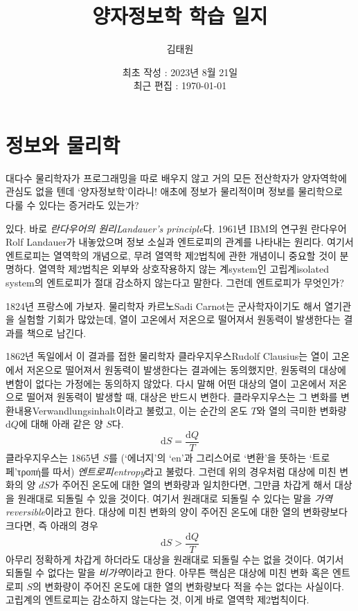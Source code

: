 \documentclass[a4paper,chapter,atbegshi]{oblivoir}
\title{양자정보학 학습 일지}
\author{김태원}
\date{최초 작성 : 2023년 8월 21일 \\ 최근 편집 : \today}
\begin{document}
\maketitle

\chapter{정보와 물리학}
대다수 물리학자가 프로그래밍을 따로 배우지 않고 거의 모든 전산학자가 양자역학에
관심도 없을 텐데 `양자정보학'이라니! 애초에 정보가 물리적이며 정보를 물리학으로
다룰 수 있다는 증거라도 있는가? 

있다. 바로 \emph{란다우어의 원리\tiny Landauer's principle}다.
1961년 IBM의 연구원 란다우어{\tiny Rolf Landauer}가 내놓았으며 정보 소실과
엔트로피의 관계를 나타내는 원리다. 여기서 엔트로피는 열역학의 개념으로, 
무려 열역학 제2법칙에 관한 개념이니 중요할 것이 분명하다. 열역학 제2법칙은
외부와 상호작용하지 않는 계{\tiny system}인 고립계{\tiny isolated system}의
엔트로피가 절대 감소하지 않는다고 말한다. 그런데 엔트로피가 무엇인가? 

1824년 프랑스에 가보자. 물리학자 카르노{\tiny Sadi Carnot}는 군사학자이기도
해서 열기관을 실험할 기회가 많았는데, 열이 고온에서 저온으로 떨어져서 원동력이
발생한다는 결과를 책으로 남긴다.

1862년 독일에서 이 결과를 접한 물리학자 클라우지우스{\tiny Rudolf Clausius}는 
열이 고온에서 저온으로 떨어져서 원동력이 발생한다는 결과에는 동의했지만, 
원동력의 대상에 변함이 없다는 가정에는 동의하지 않았다. 다시 말해 어떤
대상의 열이 고온에서 저온으로 떨어져 원동력이 발생할 때, 대상은 반드시
변한다. 클라우지우스는 그 변화를 변환내용{\tiny Verwandlungsinhalt}이라고
불렀고, 이는 순간의 온도 $T$와 열의 극미한 변화량 $\textrm{d}Q$에 대해 
아래 같은 양 $S$다.
\begin{equation}
  \textrm{d}S = \frac{\textrm{d}Q}{T}
\end{equation}
클라우지우스는 1865년 $S$를 (`에너지'의 `en'과 그리스어로 `변환'을 뜻하는
`트로페'{\tiny τροπή}를 따서) \emph{엔트로피\tiny entropy}라고 불렀다. 그런데
위의 경우처럼 대상에 미친 변화의 양 $dS$가 주어진 온도에 대한 열의 변화량과
일치한다면, 그만큼 차갑게 해서 대상을 원래대로 되돌릴 수 있을 것이다. 여기서
원래대로 되돌릴 수 있다는 말을 \emph{가역\tiny reversible}이라고 한다. 대상에
미친 변화의 양이 주어진 온도에 대한 열의 변화량보다 크다면, 즉 아래의 경우
\begin{equation}\label{eq:12}
  \textrm{d}S > \frac{\textrm{d}Q}{T}
\end{equation}
아무리 정확하게 차갑게 하더라도 대상을 원래대로 되돌릴 수는 없을 것이다. 여기서
되돌릴 수 없다는 말을 \emph{비가역}이라고 한다. 아무튼 핵심은 대상에 미친 변화
혹은 엔트로피 $S$의 변화량이 주어진 온도에 대한 열의 변화량보다 적을 수는 없다는
사실이다. 고립계의 엔트로피는 감소하지 않는다는 것, 이게 바로 열역학 제2법칙이다.
\end{document}
